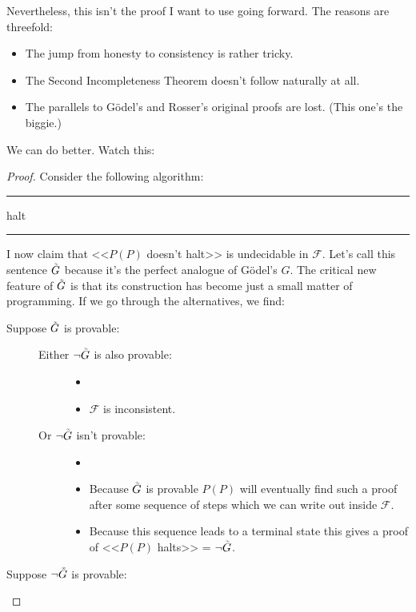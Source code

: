 \documentclass{article}
\theoremstyle{customstyle}
\newcommand{\F}{\ensuremath{\mathcal{F}}}
\newcommand{\iGoedel}{\ensuremath{\accentset{\scalebox{0.35}{$\infty$}}{G}}}
\newenvironment{algo}{\begin{samepage}\medskip\hrule\begin{algorithmic}}{\end{algorithmic}\hrule\medskip\end{samepage}}
\begin{document}
Nevertheless, this isn't the proof I want to use going forward. The reasons are threefold:
\begin{itemize}[topsep=0.5em, label=$\bullet$]
\item The jump from honesty to consistency is rather tricky.
\item The Second Incompleteness Theorem doesn't follow naturally at all.
\item The parallels to Gödel's and Rosser's original proofs are lost. (This one's the biggie.)
\end{itemize}
We can do better. Watch this:
\begin{proof}
Consider the following algorithm:
\begin{algo}
      \State halt
    \EndIf
  \EndFor
\EndFunction
\end{algo}
I now claim that <<$P(P)$ doesn't halt>> is undecidable in $\F$. Let's call this sentence $\iGoedel$ because it's the perfect analogue of Gödel's $G$. The critical new feature of $\iGoedel$ is that its construction has become just a small matter of programming. If we go through the alternatives, we find:
\begin{description}
\item[Suppose $\iGoedel$ is provable:]
\begin{description}
\item[]
\item[Either $\neg \iGoedel$ is also provable:]
\begin{itemize}
\item[]
\item $\F$ is inconsistent. \lightning
\end{itemize}
\item[Or $\neg \iGoedel$ isn't provable:]
\begin{itemize}
\item[]
\item Because $\iGoedel$ is provable $P(P)$ will eventually find such a proof after some sequence of steps which we can write out inside $\F$.
\item Because this sequence leads to a terminal state this gives a proof of <<$P(P)$ halts>> = $\neg \iGoedel$. \lightning
\end{itemize}
\end{description}
\item[Suppose $\neg \iGoedel$ is provable:]
\begin{description}

\end{description}
\end{description}
\end{proof}
\end{document}
